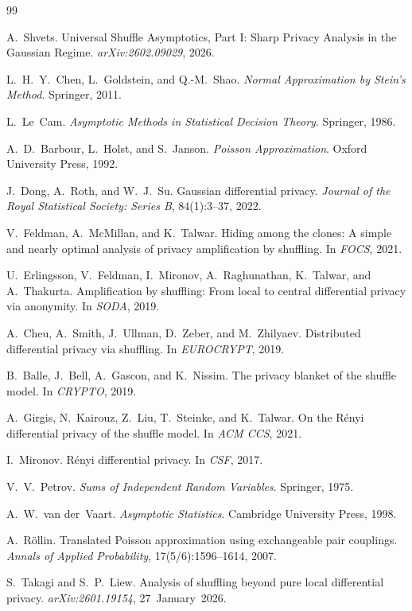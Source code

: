 \documentclass{article}
\begin{document}
\begin{thebibliography}{99}

 A.~Shvets. Universal Shuffle Asymptotics, Part I: Sharp Privacy Analysis in the Gaussian Regime. \textit{arXiv:2602.09029}, 2026.

 L.~H.~Y.~Chen, L.~Goldstein, and Q.-M.~Shao. \textit{Normal Approximation by Stein's Method}. Springer, 2011.

 L.~Le~Cam. \textit{Asymptotic Methods in Statistical Decision Theory}. Springer, 1986.

 A.~D.~Barbour, L.~Holst, and S.~Janson. \textit{Poisson Approximation}. Oxford University Press, 1992.

 J.~Dong, A.~Roth, and W.~J.~Su. Gaussian differential privacy. \textit{Journal of the Royal Statistical Society: Series B}, 84(1):3--37, 2022.

 V.~Feldman, A.~McMillan, and K.~Talwar. Hiding among the clones: A simple and nearly optimal analysis of privacy amplification by shuffling. In \textit{FOCS}, 2021.

 U.~Erlingsson, V.~Feldman, I.~Mironov, A.~Raghunathan, K.~Talwar, and A.~Thakurta. Amplification by shuffling: From local to central differential privacy via anonymity. In \textit{SODA}, 2019.

 A.~Cheu, A.~Smith, J.~Ullman, D.~Zeber, and M.~Zhilyaev. Distributed differential privacy via shuffling. In \textit{EUROCRYPT}, 2019.

 B.~Balle, J.~Bell, A.~Gascon, and K.~Nissim. The privacy blanket of the shuffle model. In \textit{CRYPTO}, 2019.

 A.~Girgis, N.~Kairouz, Z.~Liu, T.~Steinke, and K.~Talwar. On the R\'{e}nyi differential privacy of the shuffle model. In \textit{ACM CCS}, 2021.

 I.~Mironov. R\'{e}nyi differential privacy. In \textit{CSF}, 2017.

 V.~V.~Petrov. \textit{Sums of Independent Random Variables}. Springer, 1975.

 A.~W.~van der~Vaart. \textit{Asymptotic Statistics}. Cambridge University Press, 1998.

 A.~R\"{o}llin. Translated Poisson approximation using exchangeable pair couplings. \textit{Annals of Applied Probability}, 17(5/6):1596--1614, 2007.

 S.~Takagi and S.~P.~Liew. Analysis of shuffling beyond pure local differential privacy. \textit{arXiv:2601.19154}, 27~January~2026.

\end{thebibliography}
\end{document}
